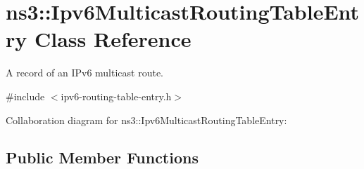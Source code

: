 \hypertarget{classns3_1_1Ipv6MulticastRoutingTableEntry}{}\section{ns3\+:\+:Ipv6\+Multicast\+Routing\+Table\+Entry Class Reference}
\label{classns3_1_1Ipv6MulticastRoutingTableEntry}


A record of an I\+Pv6 multicast route.  




{\ttfamily \#include $<$ipv6-\/routing-\/table-\/entry.\+h$>$}



Collaboration diagram for ns3\+:\+:Ipv6\+Multicast\+Routing\+Table\+Entry\+:
\subsection*{Public Member Functions}
